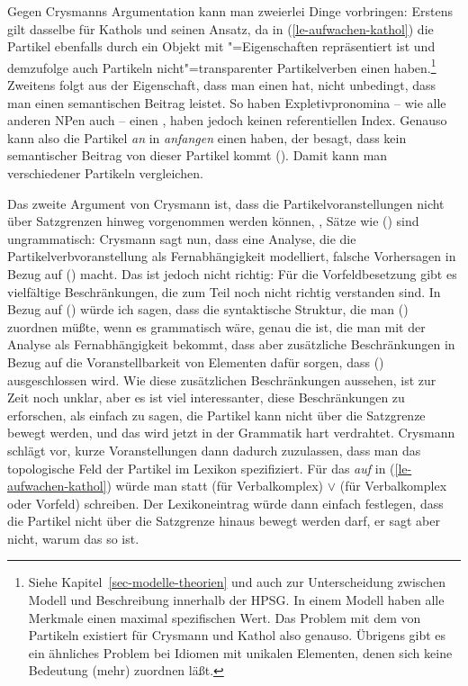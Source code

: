 Gegen Crysmanns Argumentation kann man zweierlei Dinge vorbringen: Erstens
gilt dasselbe für Kathols und seinen Ansatz, da in (\ref{le-aufwachen-kathol})
die Partikel ebenfalls durch ein Objekt mit "=Eigenschaften repräsentiert
ist und demzufolge auch Partikeln nicht"=transparenter Partikelverben einen \contw haben.\footnote{
Siehe Kapitel~\ref{sec-modelle-theorien} und auch 
zur Unterscheidung zwischen Modell und Beschreibung innerhalb der HPSG. In einem
Modell haben alle Merkmale einen maximal spezifischen Wert. Das Problem mit dem
\contw von Partikeln existiert für Crysmann und Kathol also genauso. Übrigens gibt
es ein ähnliches Problem bei Idiomen mit unikalen Elementen, denen sich keine
Bedeutung (mehr) zuordnen läßt.%
} 
Zweitens folgt aus der
Eigenschaft, dass man einen \contw hat, nicht unbedingt, dass man einen semantischen
Beitrag leistet. So haben Expletivpronomina 
-- wie alle anderen NPen auch -- einen \contw, 
haben jedoch keinen referentiellen Index. Genauso kann also die
Partikel \emph{an} in \emph{anfangen} einen \contw haben, der besagt, dass kein
semantischer Beitrag von dieser Partikel kommt (\zb {}).
Damit kann man \contwe verschiedener Partikeln vergleichen.

Das zweite Argument von Crysmann ist, dass die Partikelvoranstellungen
nicht über Satzgrenzen hinweg vorgenommen werden können, \dash, Sätze wie
() sind ungrammatisch:
\z
{}
Crysmann sagt nun, dass eine Analyse, die die Partikelverbvoranstellung als
Fernabhängigkeit modelliert, falsche Vorhersagen in Bezug auf () macht.
Das ist jedoch nicht richtig: Für die Vorfeldbesetzung gibt es vielfältige
Beschränkungen, die zum Teil noch nicht richtig verstanden sind. In Bezug auf ()
würde ich sagen, dass die syntaktische Struktur, die man () zuordnen
müßte, wenn es grammatisch wäre, genau die ist, die man mit der Analyse als
Fernabhängigkeit bekommt, dass aber zusätzliche Beschränkungen in Bezug auf die Voranstellbarkeit
von Elementen dafür sorgen, dass () ausgeschlossen wird.
Wie diese zusätzlichen Beschränkungen aussehen, ist zur Zeit noch unklar, aber
es ist viel interessanter, diese Beschränkungen zu erforschen, als einfach zu sagen,
die Partikel kann nicht über die Satzgrenze bewegt werden, und das wird jetzt in
der Grammatik hart verdrahtet. Crysmann schlägt vor, kurze Voranstellungen
dann dadurch zuzulassen, dass man das topologische Feld der Partikel im Lexikon
spezifiziert. Für das \emph{auf} in (\ref{le-aufwachen-kathol})
würde man statt  (für Verbalkomplex)
 $\vee$  (für Verbalkomplex oder Vorfeld) schreiben.
Der Lexikoneintrag würde dann einfach festlegen, dass die Partikel nicht über die Satzgrenze 
hinaus bewegt werden darf, er sagt aber nicht, warum das so ist.

